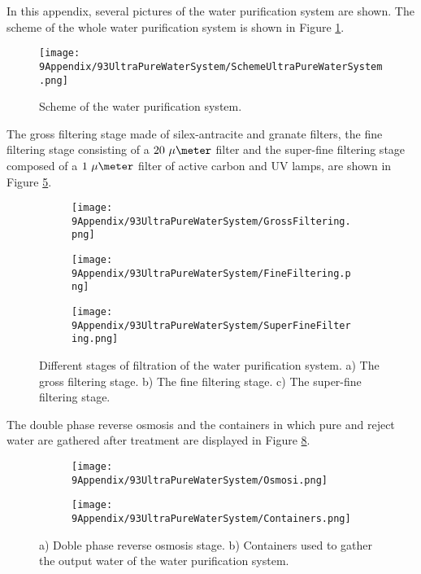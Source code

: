 In this appendix, several pictures of the water purification system are shown. The scheme of the whole water purification system is shown in Figure \ref{fig:SchemeUPWS}.
\begin{figure}[htbp]
\centering
\texttt{[image: 9Appendix/93UltraPureWaterSystem/SchemeUltraPureWaterSystem.png]}
\caption{Scheme of the water purification system.\label{fig:SchemeUPWS}}
\end{figure}
The gross filtering stage made of silex-antracite and granate filters, the fine filtering stage consisting of a $20~\mu\meter$ filter and the super-fine filtering stage composed of a $1~\mu\meter$ filter of active carbon and UV lamps, are shown in Figure \ref{fig:UltraPureWaterStages}.
\begin{figure}
\centering
    \begin{subfigure}[b]{0.3\textwidth}
    \centering
    \texttt{[image: 9Appendix/93UltraPureWaterSystem/GrossFiltering.png]}  
    \caption{\label{subfig:GrossFiltering}}
    \end{subfigure}
    \hfill
    \begin{subfigure}[b]{0.3\textwidth}
    \centering
    \texttt{[image: 9Appendix/93UltraPureWaterSystem/FineFiltering.png]}  
    \caption{\label{subfig:FineFiltering}}
    \end{subfigure}
    \hfill
    \begin{subfigure}[b]{0.3\textwidth}
    \centering
    \texttt{[image: 9Appendix/93UltraPureWaterSystem/SuperFineFiltering.png]}  
    \caption{\label{subfig:SuperFineFiltering}}
    \end{subfigure}
 \caption{Different stages of filtration of the water purification system. a) The gross filtering stage. b) The fine filtering stage. c) The super-fine filtering stage.}
 \label{fig:UltraPureWaterStages}
\end{figure}
The double phase reverse osmosis and the containers in which pure and reject water are gathered after treatment are displayed in Figure \ref{fig:OsmosisContainers}.
\begin{figure}
\centering
    \begin{subfigure}[b]{0.5\textwidth}
    \centering
    \texttt{[image: 9Appendix/93UltraPureWaterSystem/Osmosi.png]}  
    \caption{\label{subfig:Osmosi}}
    \end{subfigure}
    \hfill
    \begin{subfigure}[b]{0.8\textwidth}
    \centering
    \texttt{[image: 9Appendix/93UltraPureWaterSystem/Containers.png]}  
    \caption{\label{subfig:Containers}}
    \end{subfigure}
 \caption{a) Doble phase reverse osmosis stage. b) Containers used to gather the output water of the water purification system.}
 \label{fig:OsmosisContainers}
\end{figure}
